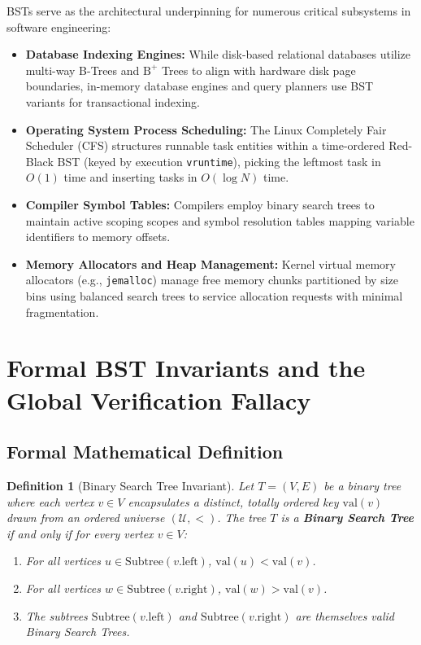 \documentclass[10pt,journal,compsoc,onecolumn]{IEEEtran}
\newtheorem{definition}[theorem]{Definition}
\begin{document}
BSTs serve as the architectural underpinning for numerous critical subsystems in software engineering:
\begin{itemize}
    \item \textbf{Database Indexing Engines:} While disk-based relational databases utilize multi-way B-Trees and $\text{B}^+$ Trees to align with hardware disk page boundaries, in-memory database engines and query planners use BST variants for transactional indexing.
    \item \textbf{Operating System Process Scheduling:} The Linux Completely Fair Scheduler (CFS) structures runnable task entities within a time-ordered Red-Black BST (keyed by execution \texttt{vruntime}), picking the leftmost task in $O(1)$ time and inserting tasks in $O(\log N)$ time.
    \item \textbf{Compiler Symbol Tables:} Compilers employ binary search trees to maintain active scoping scopes and symbol resolution tables mapping variable identifiers to memory offsets.
    \item \textbf{Memory Allocators and Heap Management:} Kernel virtual memory allocators (e.g., \texttt{jemalloc}) manage free memory chunks partitioned by size bins using balanced search trees to service allocation requests with minimal fragmentation.
\end{itemize}

\section{Formal BST Invariants and the Global Verification Fallacy}
\label{sec:invariants}

\subsection{Formal Mathematical Definition}

\begin{definition}[Binary Search Tree Invariant]
Let $T = (V, E)$ be a binary tree where each vertex $v \in V$ encapsulates a distinct, totally ordered key $\mathrm{val}(v)$ drawn from an ordered universe $(\mathcal{U}, <)$. The tree $T$ is a \textbf{Binary Search Tree} if and only if for every vertex $v \in V$:
\begin{enumerate}
    \item For all vertices $u \in \mathrm{Subtree}(v.\mathrm{left})$, $\mathrm{val}(u) < \mathrm{val}(v)$.
    \item For all vertices $w \in \mathrm{Subtree}(v.\mathrm{right})$, $\mathrm{val}(w) > \mathrm{val}(v)$.
    \item The subtrees $\mathrm{Subtree}(v.\mathrm{left})$ and $\mathrm{Subtree}(v.\mathrm{right})$ are themselves valid Binary Search Trees.
\end{enumerate}
\end{definition}
\end{document}
